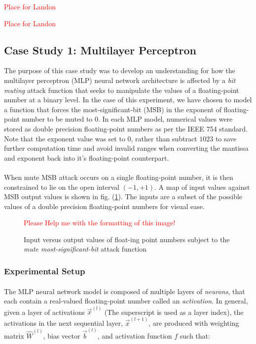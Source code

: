 \documentclass[12pt,letterpaper]{article}
\begin{document}
\textcolor{red}{Place for Landon}

\textcolor{red}{Place for Landon}

\subsection{Case Study 1: Multilayer Perceptron}

The purpose of this case study was to develop an understanding for how the multilayer perceptron (MLP) neural network architecture is affected by a \textit{bit muting} attack function that seeks to manipulate the values of a floating-point number at a binary level. In the case of this experiment, we have chosen to model a function that forces the most-significant-bit (MSB) in the exponent of floating-point number to be muted to $0$. In each MLP model, numerical values were stored as double precision floating-point numbers as per the IEEE 754 standard. Note that the exponent value was set to $0$, rather than subtract $1023$ to save further computation time and avoid invalid ranges when converting the mantissa and exponent back into it's floating-point counterpart.
\paragraph*{}When mute MSB attack occurs on a single floating-point number,  it is then constrained to lie on the open interval $(-1,+1)$. A map of input values against MSB output values is shown in fig. (\ref{MUTE MSB}). The inputs are a subset of the possible values of a double precision floating-point numbers for visual ease.

\begin{figure}[h]
	\centering
	\textcolor{red}{Please Help me with the formatting of this image!}
	\label{MUTE MSB}
	\caption{Input versus output values of float-ing point numbers subject to the \textit{mute most-significant-bit} attack function}
\end{figure}

\subsubsection{Experimental Setup}

\paragraph*{}The MLP neural network model is composed of multiple layers of \textit{neurons}, that each contain a real-valued floating-point number called an \textit{activation}.  In general, given a layer of activations $\vec{x}^{(l)}$ (The superscript is used as a layer index), the activations in the next sequential layer, $\vec{x}^{(l+1)}$, are produced with weighting matrix $\hat{W}^{(l)}$, bias vector $\vec{b}^{(l)}$, and activation function $f$ such that:
\end{document}
